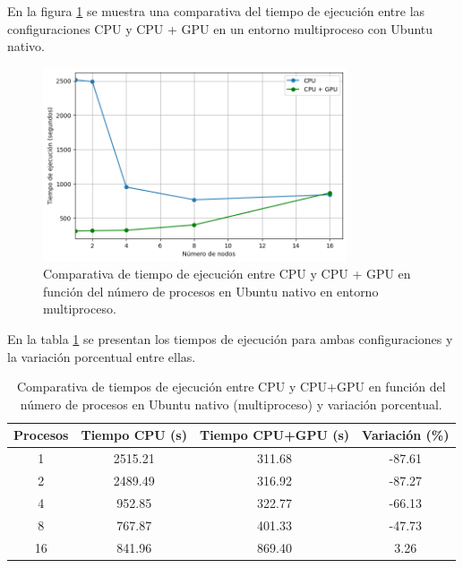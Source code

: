 En la figura \ref{fig:multi-node_ubuntu_cpu_vs_gpu_native_time} se muestra una comparativa del tiempo de ejecución entre las configuraciones CPU y CPU + GPU en un entorno multiproceso con Ubuntu nativo.

\begin{figure}[H]
    \centering
    \includegraphics[width=0.8\textwidth]{imagenes/cap5/multi-node_ubuntu_cpu_vs_gpu_native_time.png}
    \caption{Comparativa de tiempo de ejecución entre CPU y CPU + GPU en función del número de procesos en Ubuntu nativo en entorno multiproceso.}
    \label{fig:multi-node_ubuntu_cpu_vs_gpu_native_time}
\end{figure}

En la tabla \ref{tab:multi-node_ubuntu_cpu_vs_gpu_native} se presentan los tiempos de ejecución para ambas configuraciones y la variación porcentual entre ellas.

\begin{table}[ht]
    \centering
    \begin{tabular}{|c|c|c|c|}
        \hline
        \textbf{Procesos} & \textbf{Tiempo CPU (s)} & \textbf{Tiempo CPU+GPU (s)} & \textbf{Variación (\%)} \\
        \hline
        1                 & 2515.21                 & 311.68                      & -87.61                  \\
        2                 & 2489.49                 & 316.92                      & -87.27                  \\
        4                 & 952.85                  & 322.77                      & -66.13                  \\
        8                 & 767.87                  & 401.33                      & -47.73                  \\
        16                & 841.96                  & 869.40                      & 3.26                    \\
        \hline
    \end{tabular}
    \caption{Comparativa de tiempos de ejecución entre CPU y CPU+GPU en función del número de procesos en Ubuntu nativo (multiproceso) y variación porcentual.}
    \label{tab:multi-node_ubuntu_cpu_vs_gpu_native}
\end{table}

